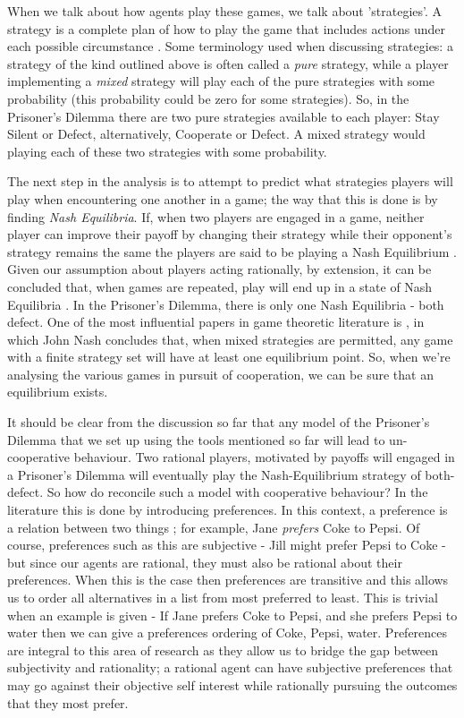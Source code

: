 \documentclass[11pt]{article}
\newcommand*{\np}{\par\noindent\newline}
\begin{document}
\np When we talk about how agents play these games, we talk about 'strategies'. A strategy is a complete plan of how to
play the game that includes actions under each possible circumstance \cite{angner_course_2012}. Some terminology used
when discussing strategies: a strategy of the kind outlined above is often called a \textit{pure} strategy, while a
player implementing a \textit{mixed} strategy will play each of the pure strategies with some probability (this
probability could be zero for some strategies). So, in the Prisoner's Dilemma there are two pure strategies available to
each player: Stay Silent or Defect, alternatively, Cooperate or Defect. A mixed strategy would playing each of these two
strategies with some probability.

\np The next step in the analysis is to attempt to predict what strategies players will play when encountering one
another in a game; the way that this is done is by finding \textit{Nash Equilibria}. If, when two players are engaged in
a game, neither player can improve their payoff by changing their strategy while their opponent's strategy remains the
same the players are said to be playing a Nash Equilibrium \cite{angner_course_2012}. Given our assumption about players
acting rationally, by extension, it can be concluded that, when games are repeated, play will end up in a state of Nash
Equilibria \cite{kalai_rational_1993}. In the Prisoner's Dilemma, there is only one Nash Equilibria - both defect. One
of the most influential papers in game theoretic literature is \cite{nash_equilibrium_1950}, in which John Nash
concludes that, when mixed strategies are permitted, any game with a finite strategy set will have at least one equilibrium point. So, when we're analysing the various games in pursuit of cooperation, we can be sure that an equilibrium exists.

\np It should be clear from the discussion so far that any model of the Prisoner's Dilemma that we set up using the
tools mentioned so far will lead to un-cooperative behaviour. Two rational players, motivated by payoffs will engaged in
a Prisoner's Dilemma will eventually play the Nash-Equilibrium strategy of both-defect. So how do reconcile such a model
with cooperative behaviour? In the literature this is done by introducing preferences. In this context, a preference is
a relation between two things \cite{angner_course_2012}; for example, Jane \textit{prefers} Coke to Pepsi. Of course,
preferences such as this are subjective - Jill might prefer Pepsi to Coke - but since our agents are rational, they must
also be rational about their preferences. When this is the case then preferences are transitive and this allows us to
order all alternatives in a list from most preferred to least. This is trivial when an example is given - If Jane
prefers Coke to Pepsi, and she prefers Pepsi to water then we can give a preferences ordering of Coke, Pepsi, water.
Preferences are integral to this area of research as they allow us to bridge the gap between subjectivity and
rationality; a rational agent can have subjective preferences that may go against their objective self interest while
rationally pursuing the outcomes that they most prefer.
\end{document}
